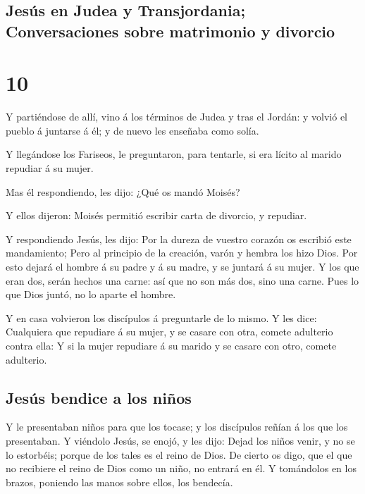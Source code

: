 \hypertarget{jesuxfas-en-judea-y-transjordania-conversaciones-sobre-matrimonio-y-divorcio}{%
\subsection{Jesús en Judea y Transjordania; Conversaciones sobre
matrimonio y
divorcio}\label{jesuxfas-en-judea-y-transjordania-conversaciones-sobre-matrimonio-y-divorcio}}

\hypertarget{section-9}{%
\section{10}\label{section-9}}

 Y partiéndose de allí, vino á los términos de Judea y
tras el Jordán: y volvió el pueblo á juntarse á él; y de nuevo les
enseñaba como solía.

 Y llegándose los Fariseos, le preguntaron, para tentarle,
si era lícito al marido repudiar á su mujer.

 Mas él respondiendo, les dijo: ¿Qué os mandó Moisés?

 Y ellos dijeron: Moisés permitió escribir carta de
divorcio, y repudiar.

 Y respondiendo Jesús, les dijo: Por la dureza de vuestro
corazón os escribió este mandamiento;  Pero al principio
de la creación, varón y hembra los hizo Dios.  Por esto
dejará el hombre á su padre y á su madre, y se juntará á su mujer.
 Y los que eran dos, serán hechos una carne: así que no
son más dos, sino una carne.  Pues lo que Dios juntó, no
lo aparte el hombre.

 Y en casa volvieron los discípulos á preguntarle de lo
mismo.  Y les dice: Cualquiera que repudiare á su mujer,
y se casare con otra, comete adulterio contra ella:  Y si
la mujer repudiare á su marido y se casare con otro, comete adulterio.

\hypertarget{jesuxfas-bendice-a-los-niuxf1os}{%
\subsection{Jesús bendice a los
niños}\label{jesuxfas-bendice-a-los-niuxf1os}}

 Y le presentaban niños para que los tocase; y los
discípulos reñían á los que los presentaban.  Y viéndolo
Jesús, se enojó, y les dijo: Dejad los niños venir, y no se lo
estorbéis; porque de los tales es el reino de Dios.  De
cierto os digo, que el que no recibiere el reino de Dios como un niño,
no entrará en él.  Y tomándolos en los brazos, poniendo
las manos sobre ellos, los bendecía.

